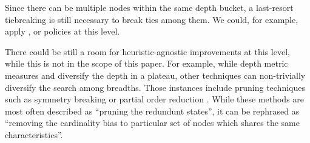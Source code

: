 Since there can be multiple nodes within the same depth bucket,
a last-resort tiebreaking is still necessary to break ties among them.
We could, for example, apply \lifo, \fifo or \ro policies at this level.

There could be still a room for heuristic-agnostic improvements at
this level, while this is not in the scope of this paper.
For example, while depth metric measures and diversify the depth in a plateau,
other techniques can non-trivially diversify the search among breadths.
Those instances include pruning techniques such as 
symmetry breaking \cite{Fox1998,pochter2011exploiting,domshlak2013symmetry}
or partial order reduction \cite{hall2013faster,wehrle2013relative}.
While these methods are most often described as ``pruning the redundunt states'',
it can be rephrased as ``removing the cardinality bias to particular set of nodes
which shares the same characteristics''.






